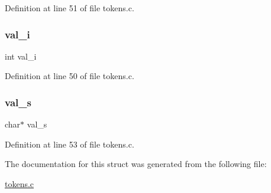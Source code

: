 Definition at line 51 of file tokens.\+c.

\mbox{\label{structtoken__info_a5aca99878d252001e7155853bef92c02}} 
\subsubsection{\texorpdfstring{val\+\_\+i}{val\_i}}
{\footnotesize\ttfamily int val\+\_\+i}



Definition at line 50 of file tokens.\+c.

\mbox{\label{structtoken__info_aa00629ea53975a7720bbe8c50637ce1c}} 
\subsubsection{\texorpdfstring{val\+\_\+s}{val\_s}}
{\footnotesize\ttfamily char$\ast$ val\+\_\+s}



Definition at line 53 of file tokens.\+c.



The documentation for this struct was generated from the following file\+:\begin{DoxyCompactItemize}
\item 
\mbox{\hyperlink{tokens_8c}{tokens.\+c}}\end{DoxyCompactItemize}
